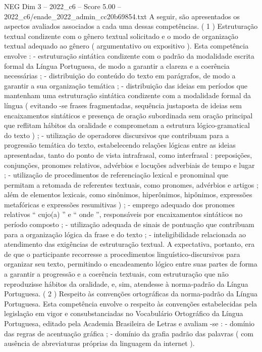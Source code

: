 \begin{textsample}{NEG Dim 3 – 2022\_c6 – Score 5.00 – 2022\_c6/enade\_2022\_admin\_cc20b69854.txt}
A seguir, são apresentados os aspectos avaliados associados a cada uma dessas competências. ( 1 ) Estruturação textual condizente com o gênero textual solicitado e o modo de organização textual adequado ao gênero ( argumentativo ou expositivo ).
Esta competência envolve : - estruturação sintática condizente com o padrão da modalidade escrita formal da Língua Portuguesa, de modo a garantir a clareza e a coerência necessárias ; - distribuição do conteúdo do texto em parágrafos, de modo a garantir a sua organização temática ; - distribuição das ideias em períodos que mantenham uma estruturação sintática condizente com a modalidade formal da língua ( evitando -se frases fragmentadas, sequência justaposta de ideias sem encaixamentos sintáticos e presença de oração subordinada sem oração principal que reflitam hábitos da oralidade e comprometam a estrutura lógico-gramatical do texto ) ; - utilização de operadores discursivos que contribuam para a progressão temática do texto, estabelecendo relações lógicas entre as ideias apresentadas, tanto do ponto de vista intrafrasal, como interfrasal : preposições, conjunções, pronomes relativos, advérbios e locuções adverbiais de tempo e lugar ; - utilização de procedimentos de referenciação lexical e pronominal que permitam a retomada de referentes textuais, como pronomes, advérbios e artigos ; além de elementos lexicais, como sinônimos, hiperônimos, hipônimos, expressões metafóricas e expressões resumitivas ) ; - emprego adequado dos pronomes relativos “ cujo(a) ” e “ onde ”, responsáveis por encaixamentos sintáticos no período composto ; - utilização adequada de sinais de pontuação que contribuam para a organização lógica da frase e do texto ; - inteligibilidade relacionada ao atendimento das exigências de estruturação textual.
A expectativa, portanto, era de que o participante recorresse a procedimentos linguístico-discursivos para organizar seu texto, permitindo o encadeamento lógico entre suas partes de forma a garantir a progressão e a coerência textuais, com estruturação que não reproduzisse hábitos da oralidade, e, sim, atendesse à norma-padrão da Língua Portuguesa. ( 2 ) Respeito às convenções ortográficas da norma-padrão da Língua Portuguesa.
Esta competência envolve o respeito às convenções estabelecidas pela legislação em vigor e consubstanciadas no Vocabulário Ortográfico da Língua Portuguesa, editado pela Academia Brasileira de Letras e avaliam -se : - domínio das regras de acentuação gráfica ; - domínio da grafia padrão das palavras ( com ausência de abreviaturas próprias da linguagem da internet ).

\end{textsample}
